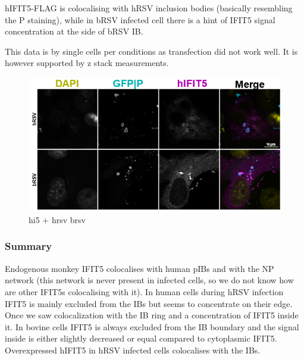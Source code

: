 hIFIT5-FLAG is colocalising with hRSV inclusion bodies (basically resembling the P staining), while in bRSV infected cell there is a hint of IFIT5 signal concentration at the side of bRSV IB.

This data is by single cells per conditions as transfection did not work well. It is however supported by z stack measurements.


\begin{figure}
    \centering
    \includegraphics[width=1\linewidth]{08. Chapter 3/Figs/05. IFIT5/05. hi5-hrsv-brsv.png}
    \caption[hi5 + hrsv brsv]{hi5 + hrsv brsv}
    \label{hi5 + hrsv brsv}
\end{figure}

\subsubsection{Summary} \label{Summary}
Endogenous monkey IFIT5 colocalises with human pIBs and with the NP network (this network is never present in infected cells, so we do not know how are other IFIT5s colocalising with it). In human cells during hRSV infection IFIT5 is mainly excluded from the IBs but seems to concentrate on their edge. Once we saw colocalization with the IB ring and a concentration of IFIT5 inside it. In bovine cells IFIT5 is always excluded from the IB boundary and the signal inside is either slightly decreased or equal compared to cytoplasmic IFIT5. Overexpressed hIFIT5 in hRSV infected cells colocalises with the IBs.